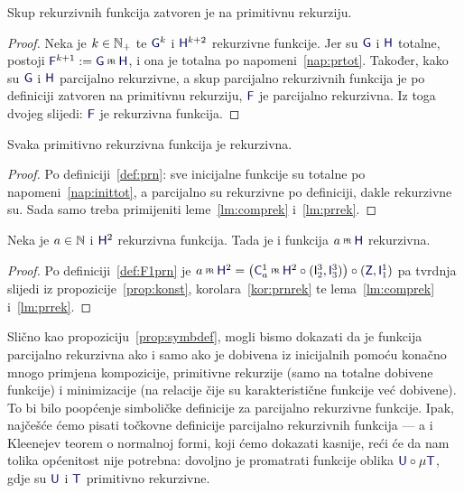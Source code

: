 \begin{lema}[{name=[zatvorenost skupa rekurzivnih funkcija na primitivnu rekurziju]}]\label{lm:prrek}
Skup rekurzivnih funkcija zatvoren je na primitivnu rekurziju.
\end{lema}
\begin{proof}
    Neka je $k\in{\mathbb N}_+$ te $\f G^k$ i $\f H^{k+2}$ rekurzivne funkcije. Jer su $\f G$ i $\f H$ totalne, postoji $\f F^{k+1}:=\f G\pr\f H$, i ona je totalna po napomeni~\ref{nap:prtot}. Također, kako su $\f G$ i $\f H$ parcijalno rekurzivne, a skup parcijalno rekurzivnih funkcija je po definiciji zatvoren na primitivnu rekurziju, $\f F$ je parcijalno rekurzivna. Iz toga dvojeg slijedi: $\f F$ je rekurzivna funkcija.
\end{proof}

\begin{korolar}[{name=[rekurzivnost primitivno rekurzivnih funkcija]}]\label{kor:prnrek}
Svaka primitivno rekurzivna funkcija je rekurzivna.
\end{korolar}
\begin{proof}
    Po definiciji~\ref{def:prn}: sve inicijalne funkcije su totalne po napomeni~\ref{nap:inittot}, a parcijalno su rekurzivne po definiciji, dakle rekurzivne su.
	Sada samo treba primijeniti leme~\ref{lm:comprek} i~\ref{lm:prrek}.
\end{proof}

\begin{korolar}[{name=[degenerirana primitivna rekurzija iz rekurzivne funkcije]}]\label{kor:F1rek}
Neka je $a\in{\mathbb N}$ i $\f H^2$ rekurzivna funkcija. Tada je i funkcija $a\pr\f H$ rekurzivna.
\end{korolar}
\begin{proof}
	Po definiciji~\ref{def:F1prn} je $a\pr\f H^2=\bigl(\f C_a^1\pr\f H^2\circ(\f I_2^3,\f I_3^3)\bigr)\circ(\f Z,\f I_1^1)$ pa tvrdnja slijedi iz propozicije~\ref{prop:konst}, korolara~\ref{kor:prnrek} te lema~\ref{lm:comprek} i~\ref{lm:prrek}.
\end{proof}

Slično kao propoziciju~\ref{prop:symbdef}, mogli bismo dokazati da je funkcija parcijalno rekurzivna ako i samo ako je dobivena iz inicijalnih pomoću konačno mnogo primjena kompozicije, primitivne rekurzije (samo na totalne dobivene funkcije) i minimizacije (na relacije čije su karakteristične funkcije već dobivene). To bi bilo poopćenje simboličke definicije za parcijalno rekurzivne funkcije. Ipak, najčešće ćemo pisati točkovne definicije parcijalno rekurzivnih funkcija --- a i Kleenejev teorem o normalnoj formi, koji ćemo dokazati kasnije, reći će da nam tolika općenitost nije potrebna: dovoljno je promatrati funkcije oblika $\f U\circ\mu\f T$, gdje su $\f U$ i $\f T$ primitivno rekurzivne.

